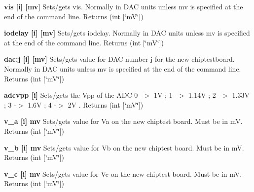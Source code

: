 \begin{DoxyItemize}
\item {\bfseries vis \mbox{[}i\mbox{]} \mbox{[}mv\mbox{]}} Sets/gets vis. Normally in DAC units unless {\ttfamily mv} is specified at the end of the command line. {\ttfamily Returns} {\ttfamily }(int \mbox{[}\char`\"{}mV\char`\"{}\mbox{]})
\end{DoxyItemize}


\begin{DoxyItemize}
\item {\bfseries iodelay \mbox{[}i\mbox{]} \mbox{[}mv\mbox{]}} Sets/gets iodelay. Normally in DAC units unless {\ttfamily mv} is specified at the end of the command line. {\ttfamily Returns} {\ttfamily }(int \mbox{[}\char`\"{}mV\char`\"{}\mbox{]})
\end{DoxyItemize}


\begin{DoxyItemize}
\item {\bfseries dac:j \mbox{[}i\mbox{]} \mbox{[}mv\mbox{]}} Sets/gets value for DAC number j for the new chiptestboard. Normally in DAC units unless {\ttfamily mv} is specified at the end of the command line. {\ttfamily Returns} {\ttfamily }(int \mbox{[}\char`\"{}mV\char`\"{}\mbox{]})
\end{DoxyItemize}


\begin{DoxyItemize}
\item {\bfseries adcvpp \mbox{[}i\mbox{]} } Sets/gets the Vpp of the ADC 0 -\/$>$ 1V ; 1 -\/$>$ 1.14V ; 2 -\/$>$ 1.33V ; 3 -\/$>$ 1.6V ; 4 -\/$>$ 2V . {\ttfamily Returns} {\ttfamily }(int \mbox{[}\char`\"{}mV\char`\"{}\mbox{]})
\end{DoxyItemize}


\begin{DoxyItemize}
\item {\bfseries v\_\-a \mbox{[}i\mbox{]} mv} Sets/gets value for Va on the new chiptest board. Must be in mV. {\ttfamily Returns} {\ttfamily }(int \mbox{[}\char`\"{}mV\char`\"{}\mbox{]})
\end{DoxyItemize}


\begin{DoxyItemize}
\item {\bfseries v\_\-b \mbox{[}i\mbox{]} mv} Sets/gets value for Vb on the new chiptest board. Must be in mV. {\ttfamily Returns} {\ttfamily }(int \mbox{[}\char`\"{}mV\char`\"{}\mbox{]})
\end{DoxyItemize}


\begin{DoxyItemize}
\item {\bfseries v\_\-c \mbox{[}i\mbox{]} mv} Sets/gets value for Vc on the new chiptest board. Must be in mV. {\ttfamily Returns} {\ttfamily }(int \mbox{[}\char`\"{}mV\char`\"{}\mbox{]})
\end{DoxyItemize}


